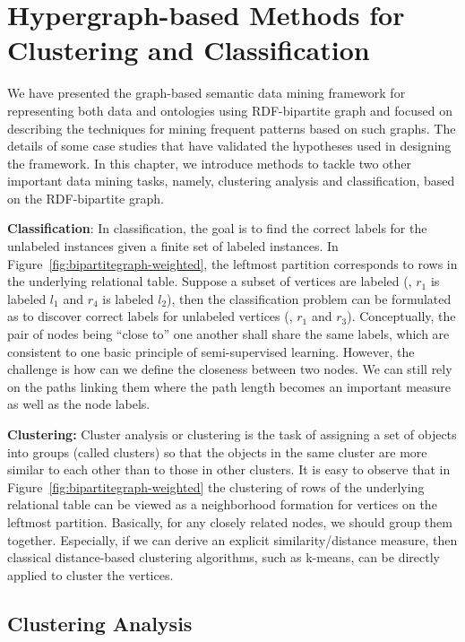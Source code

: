 \section{Hypergraph-based Methods for Clustering and Classification}
We have presented the graph-based semantic data mining framework for representing both data and ontologies using RDF-bipartite graph and focused on describing the techniques for mining frequent patterns based on such graphs. The details of some case studies that have validated the hypotheses used in designing the framework. In this chapter, we introduce methods to tackle two other important data mining tasks, namely, clustering analysis and classification, based on the RDF-bipartite graph.

\textbf{Classification}:
In classification, the goal is to find the correct labels for the unlabeled instances given a finite set of labeled instances. In Figure~\ref{fig:bipartitegraph-weighted}, the leftmost partition corresponds to rows in the underlying relational table. Suppose a subset of vertices are labeled (\eg, $r_1$ is labeled $l_1$ and $r_4$ is labeled $l_2$), then the classification problem can be formulated as to discover correct labels for unlabeled vertices (\eg, $r_1$ and $r_3$). Conceptually, the pair of nodes being ``close to'' one another shall share the same labels, which are consistent to one basic principle of  semi-supervised learning. However, the challenge is how can we define the closeness between two nodes. We can still rely on the paths linking them where the path length becomes an important measure as well as the node labels.

\textbf{Clustering:}
Cluster analysis or clustering is the task of assigning a set of objects into groups (called clusters) so that the objects in the same cluster are more similar to each other than to those in other clusters. It is easy to observe that in Figure~\ref{fig:bipartitegraph-weighted}  the clustering of rows of the underlying relational table can be viewed as a neighborhood formation for vertices on the leftmost partition. Basically, for any closely related nodes, we should group them together. Especially, if we can derive an explicit  similarity/distance measure, then classical distance-based clustering algorithms, such as k-means, can be directly applied to cluster the vertices.

\subsection{Clustering Analysis}
